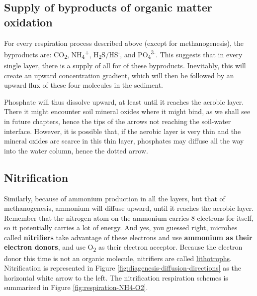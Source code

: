 \documentclass[]{book}
\theoremstyle{definition}
\theoremstyle{definition}
\theoremstyle{definition}
\theoremstyle{remark}
\begin{document}
\subsection{Supply of byproducts of organic matter
oxidation}\label{supply-of-byproducts-of-organic-matter-oxidation}

For every respiration process described above (except for
methanogenesis), the byproducts are: CO\textsubscript{2},
NH\textsubscript{4}\textsuperscript{+},
H\textsubscript{2}S/HS\textsuperscript{-}, and
PO\textsubscript{4}\textsuperscript{3-}. This suggests that in every
single layer, there is a supply of all for of these byproducts.
Inevitably, this will create an upward concentration gradient, which
will then be followed by an upward flux of these four molecules in the
sediment.

Phosphate will thus dissolve upward, at least until it reaches the
aerobic layer. There it might encounter soil mineral oxides where it
might bind, as we shall see in future chapters, hence the tips of the
arrows not reaching the soil-water interface. However, it is possible
that, if the aerobic layer is very thin and the mineral oxides are
scarce in this thin layer, phosphates may diffuse all the way into the
water column, hence the dotted arrow.

\hypertarget{nitrification}{\subsection{Nitrification}\label{nitrification}}

Similarly, because of ammonium production in all the layers, but that of
methanogenesis, ammonium will diffuse upward, until it reaches the
aerobic layer. Remember that the nitrogen atom on the ammonium carries 8
electrons for itself, so it potentially carries a lot of energy. And
yes, you guessed right, microbes called \textbf{nitrifiers} take
advantage of these electrons and use \textbf{ammonium as their electron
donors}, and use O\textsubscript{2} as their electron acceptor. Because
the electron donor this time is not an organic molecule, nitrifiers are
called \protect\hyperlink{trophic-names}{lithotrophs}. Nitrification is
represented in Figure \ref{fig:diagenesis-diffusion-directions} as the
horizontal white arrow to the left. The nitrification respiration
schemes is summarized in Figure \ref{fig:respiration-NH4-O2}.
\end{document}
